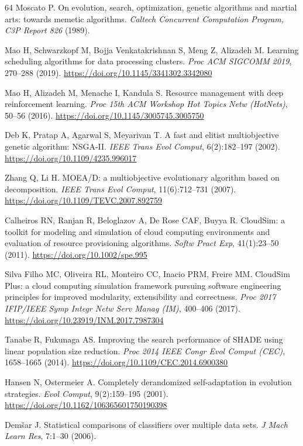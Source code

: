 \documentclass[pdflatex,onecolumn,sn-mathphys-num]{sn-jnl}
\begin{document}
\begin{thebibliography}{64}
Moscato P. On evolution, search, optimization, genetic algorithms and martial arts: towards memetic algorithms. \textit{Caltech Concurrent Computation Program, C3P Report 826} (1989).

Mao H, Schwarzkopf M, Bojja Venkatakrishnan S, Meng Z, Alizadeh M. Learning scheduling algorithms for data processing clusters. \textit{Proc ACM SIGCOMM 2019}, 270--288 (2019). \url{https://doi.org/10.1145/3341302.3342080}

Mao H, Alizadeh M, Menache I, Kandula S. Resource management with deep reinforcement learning. \textit{Proc 15th ACM Workshop Hot Topics Netw (HotNets)}, 50--56 (2016). \url{https://doi.org/10.1145/3005745.3005750}

Deb K, Pratap A, Agarwal S, Meyarivan T. A fast and elitist multiobjective genetic algorithm: NSGA-II. \textit{IEEE Trans Evol Comput}, 6(2):182--197 (2002). \url{https://doi.org/10.1109/4235.996017}

Zhang Q, Li H. MOEA/D: a multiobjective evolutionary algorithm based on decomposition. \textit{IEEE Trans Evol Comput}, 11(6):712--731 (2007). \url{https://doi.org/10.1109/TEVC.2007.892759}

Calheiros RN, Ranjan R, Beloglazov A, De Rose CAF, Buyya R. CloudSim: a toolkit for modeling and simulation of cloud computing environments and evaluation of resource provisioning algorithms. \textit{Softw Pract Exp}, 41(1):23--50 (2011). \url{https://doi.org/10.1002/spe.995}

Silva Filho MC, Oliveira RL, Monteiro CC, Inacio PRM, Freire MM. CloudSim Plus: a cloud computing simulation framework pursuing software engineering principles for improved modularity, extensibility and correctness. \textit{Proc 2017 IFIP/IEEE Symp Integr Netw Serv Manag (IM)}, 400--406 (2017). \url{https://doi.org/10.23919/INM.2017.7987304}

Tanabe R, Fukunaga AS. Improving the search performance of SHADE using linear population size reduction. \textit{Proc 2014 IEEE Congr Evol Comput (CEC)}, 1658--1665 (2014). \url{https://doi.org/10.1109/CEC.2014.6900380}

Hansen N, Ostermeier A. Completely derandomized self-adaptation in evolution strategies. \textit{Evol Comput}, 9(2):159--195 (2001). \url{https://doi.org/10.1162/106365601750190398}

Dem{\v s}ar J. Statistical comparisons of classifiers over multiple data sets. \textit{J Mach Learn Res}, 7:1--30 (2006).


\end{thebibliography}
\end{document}
